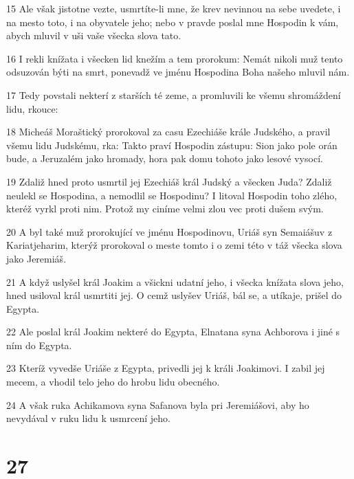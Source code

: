 \par 15 Ale však jistotne vezte, usmrtíte-li mne, že krev nevinnou na sebe uvedete, i na mesto toto, i na obyvatele jeho; nebo v pravde poslal mne Hospodin k vám, abych mluvil v uši vaše všecka slova tato.
\par 16 I rekli knížata i všecken lid knežím a tem prorokum: Nemát nikoli muž tento odsuzován býti na smrt, ponevadž ve jménu Hospodina Boha našeho mluvil nám.
\par 17 Tedy povstali nekterí z starších té zeme, a promluvili ke všemu shromáždení lidu, rkouce:
\par 18 Micheáš Moraštický prorokoval za casu Ezechiáše krále Judského, a pravil všemu lidu Judskému, rka: Takto praví Hospodin zástupu: Sion jako pole orán bude, a Jeruzalém jako hromady, hora pak domu tohoto jako lesové vysocí.
\par 19 Zdaliž hned proto usmrtil jej Ezechiáš král Judský a všecken Juda? Zdaliž neulekl se Hospodina, a nemodlil se Hospodinu? I litoval Hospodin toho zlého, kteréž vyrkl proti nim. Protož my ciníme velmi zlou vec proti dušem svým.
\par 20 A byl také muž prorokující ve jménu Hospodinovu, Uriáš syn Semaiášuv z Kariatjeharim, kterýž prorokoval o meste tomto i o zemi této v táž všecka slova jako Jeremiáš.
\par 21 A když uslyšel král Joakim a všickni udatní jeho, i všecka knížata slova jeho, hned usiloval král usmrtiti jej. O cemž uslyšev Uriáš, bál se, a utíkaje, prišel do Egypta.
\par 22 Ale poslal král Joakim nekteré do Egypta, Elnatana syna Achborova i jiné s ním do Egypta.
\par 23 Kteríž vyvedše Uriáše z Egypta, privedli jej k králi Joakimovi. I zabil jej mecem, a vhodil telo jeho do hrobu lidu obecného.
\par 24 A však ruka Achikamova syna Safanova byla pri Jeremiášovi, aby ho nevydával v ruku lidu k usmrcení jeho.

\chapter{27}

